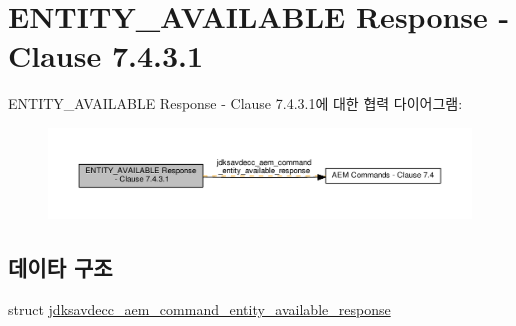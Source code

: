 \hypertarget{group__command__entity__available__response}{}\section{E\+N\+T\+I\+T\+Y\+\_\+\+A\+V\+A\+I\+L\+A\+B\+LE Response -\/ Clause 7.4.3.1}
\label{group__command__entity__available__response}
E\+N\+T\+I\+T\+Y\+\_\+\+A\+V\+A\+I\+L\+A\+B\+LE Response -\/ Clause 7.4.3.1에 대한 협력 다이어그램\+:
\nopagebreak
\begin{figure}[H]
\begin{center}
\leavevmode
\includegraphics[width=350pt]{group__command__entity__available__response}
\end{center}
\end{figure}
\subsection*{데이타 구조}
\begin{DoxyCompactItemize}
\item 
struct \hyperlink{structjdksavdecc__aem__command__entity__available__response}{jdksavdecc\+\_\+aem\+\_\+command\+\_\+entity\+\_\+available\+\_\+response}
\end{DoxyCompactItemize}
